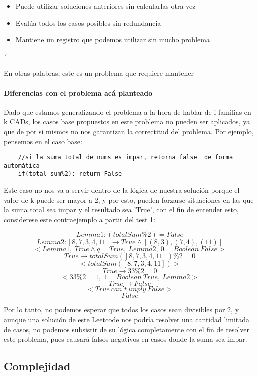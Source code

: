 \documentclass[a4paper]{article}
\begin{document}
\begin{itemize}
    \item Puede utilizar soluciones anteriores sin calcularlas otra vez
    \item Evalúa todos los casos posibles sin redundancia
    \item Mantiene un registro que podemos utilizar sin mucho problema
\end{itemize}´

En otras palabras, este es un problema que requiere mantener 

\paragraph{Diferencias con el problema acá planteado}
Dado que estamos generalizando el problema a la hora de hablar de i familias en k CADs, los
casos base propuestos en este problema no pueden ser aplicados, ya que de por si mismos no 
nos garantizan la correctitud del problema. Por ejemplo, pensemos en el caso base:
\begin{verbatim}
    //si la suma total de nums es impar, retorna false  de forma automática
    if(total_sum%2): return False 
\end{verbatim}
Este caso no nos va a servir dentro de la lógica de nuestra solución porque el 
valor de k puede ser mayor a 2, y por esto, pueden forzarse situaciones en las que la suma total
sea impar y el resultado sea 'True', con el fin de entender esto, considerese este
contraejemplo a partir del test 1:

    $$Lemma 1: (totalSum\%2) = False $$
    $$Lemma 2: [8, 7, 3, 4, 11] \rightarrow True \land [(8,3),(7,4),(11)] $$
    $$< Lemma 1, \ True \land q = True, \ Lemma 2, \ 0 = Boolean \ False >$$ 
    $$  True \rightarrow totalSum([8, 7, 3, 4, 11])\%2 = 0$$
    $$<totalSum([8, 7, 3, 4, 11])>$$ 
    $$True \rightarrow 33\%2 = 0$$
    $$<33\%2 = 1 , \ 1 = Boolean \ True, \ Lemma 2>$$ 
    $$True \rightarrow False$$
    $$<True \ can't \ imply \ False>$$
    $$False$$

Por lo tanto, no podemos esperar que todos los casos sean divisibles por 2, y aunque
una solución de este Leetcode nos podría resolver una cantidad limitada de casos, no podemos
subsistir de su lógica completamente con el fin de resolver este problema, pues causará 
falsos negativos en casos donde la suma sea impar.

\subsection{Complejidad}
\end{document}
